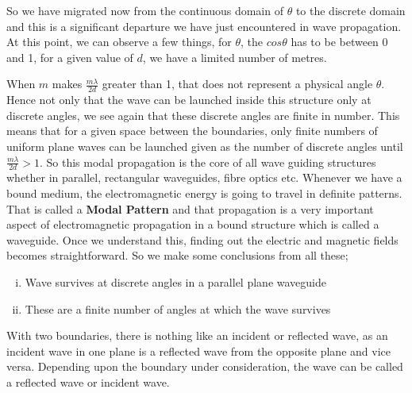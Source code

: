 So we have migrated now from the continuous domain of $\theta$ to the discrete domain and this is a significant departure we have just encountered in wave propagation. At this point, we can observe a few things, for $\theta$, the $cos\theta$ has to be between 0 and 1, for a given value of $d$, we have a limited number of metres.

When $m$ makes $\frac{m\lambda}{2d}$ greater than 1, that does not represent a physical angle $\theta$. Hence not only that the wave can be launched inside this structure only at discrete angles, we see again that these discrete angles are finite in number. This means that for a given space between the boundaries, only finite numbers of uniform plane waves can be launched given as the number of discrete angles until $\frac{m\lambda}{2d} > 1$.  So this modal propagation is the core of all wave guiding structures whether in parallel, rectangular waveguides, fibre optics etc. Whenever we have a bound medium, the electromagnetic energy is going to travel in definite patterns. That is called a \textbf{Modal Pattern} and that propagation is a very important aspect of electromagnetic propagation in a bound structure which is called a waveguide. Once we understand this, finding out the electric and magnetic fields becomes straightforward. So we make some conclusions from all these;
\begin{enumerate}[(i)]
\item Wave survives at discrete angles in a parallel plane waveguide
\item These are a finite number of angles at which the wave survives
\end{enumerate}

With two boundaries, there is nothing like an incident or reflected wave, as an incident wave in one plane is a reflected wave from the opposite plane and vice versa. Depending upon the boundary under consideration, the wave can be called a reflected wave or incident wave.

